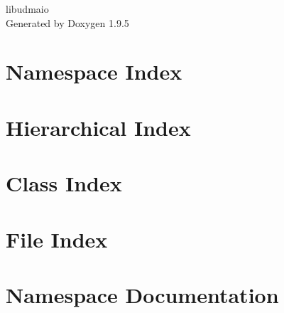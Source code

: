 \documentclass[twoside]{book}
\newcommand{\+}{\discretionary{\mbox{\scriptsize$\hookleftarrow$}}{}{}}
\newcommand{\clearemptydoublepage}{%
    \newpage{\pagestyle{empty}\cleardoublepage}%
  }
\begin{document}
  \raggedbottom
    \hypersetup{pageanchor=false,
                bookmarksnumbered=true,
                pdfencoding=unicode
               }
  \begin{titlepage}
  \vspace*{7cm}
  \begin{center}%
  {\Large libudmaio}\\
  \vspace*{1cm}
  {\large Generated by Doxygen 1.9.5}\\
  \end{center}
  \end{titlepage}
  \clearemptydoublepage
  \tableofcontents
  \clearemptydoublepage
  \hypersetup{pageanchor=true}
\chapter{Namespace Index}

\chapter{Hierarchical Index}

\chapter{Class Index}

\chapter{File Index}

\chapter{Namespace Documentation}


\end{document}
